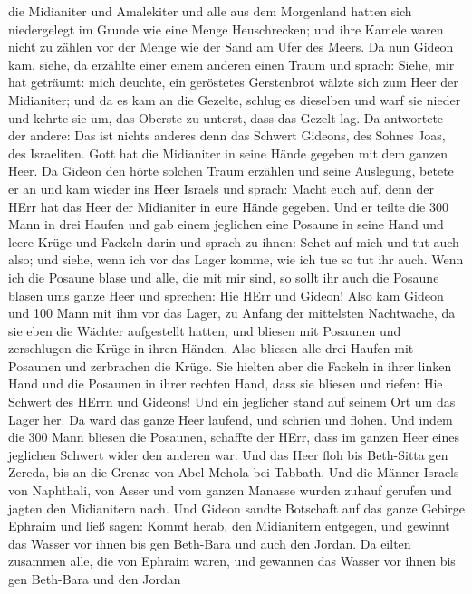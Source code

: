 die Midianiter und Amalekiter und alle aus dem Morgenland hatten sich
niedergelegt im Grunde wie eine Menge Heuschrecken; und ihre Kamele
waren nicht zu zählen vor der Menge wie der Sand am Ufer des Meers.
 Da nun Gideon kam, siehe, da erzählte einer einem anderen
einen Traum und sprach: Siehe, mir hat geträumt: mich deuchte, ein
geröstetes Gerstenbrot wälzte sich zum Heer der Midianiter; und da es
kam an die Gezelte, schlug es dieselben und warf sie nieder und kehrte
sie um, das Oberste zu unterst, dass das Gezelt lag.  Da
antwortete der andere: Das ist nichts anderes denn das Schwert Gideons,
des Sohnes Joas, des Israeliten. Gott hat die Midianiter in seine Hände
gegeben mit dem ganzen Heer.  Da Gideon den hörte solchen
Traum erzählen und seine Auslegung, betete er an und kam wieder ins Heer
Israels und sprach: Macht euch auf, denn der HErr hat das Heer der
Midianiter in eure Hände gegeben.  Und er teilte die 300
Mann in drei Haufen und gab einem jeglichen eine Posaune in seine Hand
und leere Krüge und Fackeln darin  und sprach zu ihnen:
Sehet auf mich und tut auch also; und siehe, wenn ich vor das Lager
komme, wie ich tue so tut ihr auch.  Wenn ich die Posaune
blase und alle, die mit mir sind, so sollt ihr auch die Posaune blasen
ums ganze Heer und sprechen: Hie HErr und Gideon!  Also kam
Gideon und 100 Mann mit ihm vor das Lager, zu Anfang der mittelsten
Nachtwache, da sie eben die Wächter aufgestellt hatten, und bliesen mit
Posaunen und zerschlugen die Krüge in ihren Händen.  Also
bliesen alle drei Haufen mit Posaunen und zerbrachen die Krüge. Sie
hielten aber die Fackeln in ihrer linken Hand und die Posaunen in ihrer
rechten Hand, dass sie bliesen und riefen: Hie Schwert des HErrn und
Gideons!  Und ein jeglicher stand auf seinem Ort um das
Lager her. Da ward das ganze Heer laufend, und schrien und flohen.
 Und indem die 300 Mann bliesen die Posaunen, schaffte der
HErr, dass im ganzen Heer eines jeglichen Schwert wider den anderen war.
Und das Heer floh bis Beth-Sitta gen Zereda, bis an die Grenze von
Abel-Mehola bei Tabbath.  Und die Männer Israels von
Naphthali, von Asser und vom ganzen Manasse wurden zuhauf gerufen und
jagten den Midianitern nach.  Und Gideon sandte Botschaft
auf das ganze Gebirge Ephraim und ließ sagen: Kommt herab, den
Midianitern entgegen, und gewinnt das Wasser vor ihnen bis gen Beth-Bara
und auch den Jordan. Da eilten zusammen alle, die von Ephraim waren, und
gewannen das Wasser vor ihnen bis gen Beth-Bara und den Jordan
